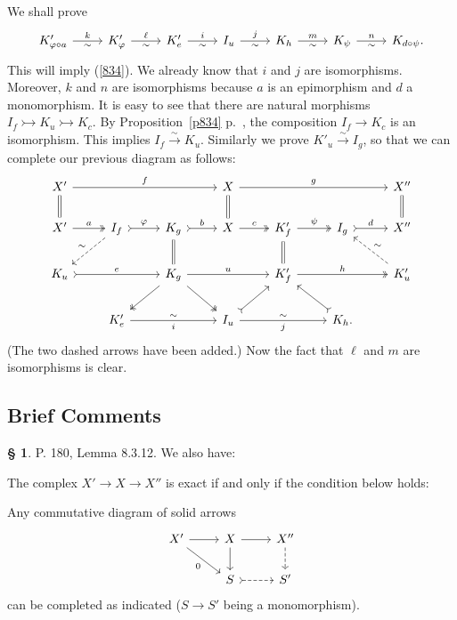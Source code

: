 \documentclass[12pt]{article}
\theoremstyle{remark}
\theoremstyle{definition}
\newtheorem{s}[thm]{\S}
\newcommand{\mono}{\rightarrowtail}%
\newcommand{\xr}{\xrightarrow}
\newcommand{\bc}{\subsection{Brief Comments}}
\begin{document}
We shall prove 
$$
\begin{tikzcd}
K'_{\varphi\circ a}\ar{r}{k}[swap]{\sim}&K'_\varphi\ar{r}{\ell}[swap]{\sim}&K'_e\ar{r}{i}[swap]{\sim}&I_u\ar{r}{j}[swap]{\sim}&K_h\ar{r}{m}[swap]{\sim}&K_\psi\ar{r}{n}[swap]{\sim}&K_{d\circ\psi}.
\end{tikzcd}
$$
This will imply (\ref{834}). We already know that $i$ and $j$ are isomorphisms. Moreover, $k$ and $n$ are isomorphisms because $a$ is an epimorphism and $d$ a monomorphism. It is easy to see that there are natural morphisms $I_f\mono K_u\mono K_c$. By Proposition~\ref{p834} p.~\pageref{p834}, the composition $I_f\to K_c$ is an isomorphism. This implies $I_f\xr\sim K_u$. Similarly we prove $K'_u\xr\sim I_g$, so that we can complete our previous diagram as follows: 
$$
\begin{tikzcd}
X'\ar{rrr}{f}\ar[equal]{d}&&&X\ar[equal]{d}\ar{rrr}{g}&&&X''\ar[equal]{d}\\ 
X'\ar[two heads]{r}{a}&I_f\ar[dashed]{dl}[swap]{\sim}\ar[tail]{r}{\varphi}&K_g\ar[equal]{d}\ar[tail]{r}{b}&X\ar[two heads]{r}{c}&K'_f\ar[equal]{d}\ar[two heads]{r}{\psi}&I_g\ar[tail]{r}{d}&X''\\ 
K_u\ar[tail]{rr}{e}&&K_g\ar[two heads]{dl}\ar[two heads]{dr}\ar{rr}{u}&&K'_f\ar[two heads]{rr}{h}&&K'_u\ar[dashed]{ul}[swap]{\sim}\\ 
&K'_e\ar{rr}{\sim}[swap]{i}&&I_u\ar[tail]{ur}\ar{rr}{\sim}[swap]{j}&&K_h.\ar[tail]{ul}
\end{tikzcd}
$$ 
(The two dashed arrows have been added.) Now the fact that $\ell$ and $m$ are isomorphisms is clear.
%
%
\bc
%
\begin{s}\label{8312}
P. 180, Lemma 8.3.12. We also have:

The complex $X'\to X\to X''$ is exact if and only if the condition below holds:

Any commutative diagram of solid arrows
$$
\begin{tikzcd}
X'\ar{dr}[swap]{0}\ar{r}&X\ar{d}\ar{r}&X''\ar[dashed]{d}\\ 
{}&S\ar[tail,dashed]{r}&S'
\end{tikzcd}
$$ 
can be completed as indicated ($S\to S'$ being a monomorphism).
\end{s}
%
%
\end{document}
